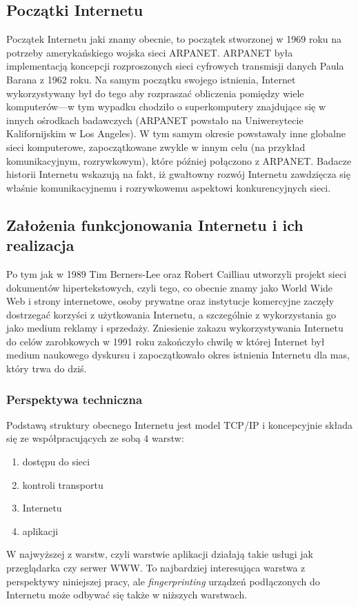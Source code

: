 \subsection{Początki Internetu}
Początek Internetu jaki znamy obecnie, to początek stworzonej w 1969 roku na
potrzeby amerykańskiego wojska sieci ARPANET. ARPANET była implementacją
koncepcji rozproszonych sieci cyfrowych transmisji danych Paula Barana z 1962
roku. Na samym początku swojego istnienia, Internet wykorzystywany był do tego
aby rozpraszać obliczenia pomiędzy wiele komputerów---w tym wypadku chodziło o
superkomputery znajdujące się w innych ośrodkach badawczych (ARPANET powstało na
Uniwersytecie Kalifornijskim w Los Angeles). W tym samym okresie powstawały inne
globalne sieci komputerowe, zapoczątkowane zwykle w innym celu (na przykład
komunikacyjnym, rozrywkowym), które później połączono z ARPANET. Badacze
historii Internetu wskazują na fakt, iż gwałtowny rozwój Internetu zawdzięcza
się właśnie komunikacyjnemu i rozrywkowemu aspektowi konkurencyjnych sieci.

\subsection{Założenia funkcjonowania Internetu i ich realizacja}
Po tym jak w 1989 Tim Berners-Lee oraz Robert Cailliau utworzyli projekt sieci
dokumentów hipertekstowych, czyli tego, co obecnie znamy jako World Wide Web i
strony internetowe, osoby prywatne oraz instytucje komercyjne zaczęły dostrzegać
korzyści z użytkowania Internetu, a szczególnie z wykorzystania go jako medium
reklamy i sprzedaży. Zniesienie zakazu wykorzystywania Internetu do celów
zarobkowych w 1991 roku zakończyło chwilę w której Internet był medium naukowego
dyskursu i zapoczątkowało okres istnienia Internetu dla mas, który trwa do dziś.

\subsubsection{Perspektywa techniczna}
Podstawą struktury obecnego Internetu jest model TCP/IP i koncepcyjnie składa
się ze współpracujących ze sobą 4 warstw:
\begin{enumerate}
	\item dostępu do sieci
	\item kontroli transportu
	\item Internetu
	\item aplikacji
\end{enumerate}
W najwyższej z warstw, czyli warstwie aplikacji działają takie usługi jak
przeglądarka czy serwer WWW. To najbardziej interesująca warstwa z perspektywy
niniejszej pracy, ale \emph{fingerprinting} urządzeń podłączonych do Internetu
może odbywać się także w niższych warstwach. %

